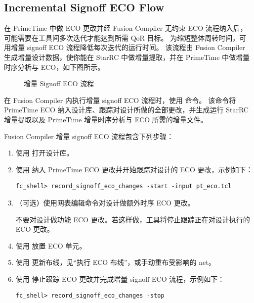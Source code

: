 \subsection*{Incremental Signoff ECO Flow}

在 PrimeTime 中做 ECO 更改并经 Fusion Compiler 无约束 ECO 流程纳入后，可能需要在工具间多次迭代才能达到所需 QoR 目标。
为缩短整体周转时间，可用增量 signoff ECO 流程降低每次迭代的运行时间。
该流程由 Fusion Compiler 生成增量设计数据，使你能在 StarRC 中做增量提取，并在 PrimeTime 中做增量时序分析与 ECO，如下图所示。

\begin{figure}[htbp]
\centering
{}
\caption{增量 Signoff ECO 流程}
\label{fig:fc-incr-signoff-eco}
\end{figure}

在 Fusion Compiler 内执行增量 signoff ECO 流程时，使用  命令。
该命令将 PrimeTime ECO 纳入设计库、跟踪对设计所做的全部更改，并生成运行 StarRC 增量提取以及 PrimeTime 增量时序分析与 ECO 所需的增量文件。

Fusion Compiler 增量 signoff ECO 流程包含下列步骤：
\begin{enumerate}
  \item 使用  打开设计库。
  \item 使用    纳入 PrimeTime ECO 更改并开始跟踪对设计的 ECO 更改，示例如下：
\begin{lstlisting}
fc_shell> record_signoff_eco_changes -start -input pt_eco.tcl
\end{lstlisting}
  \item （可选）使用网表编辑命令对设计做额外时序 ECO 更改。
  \begin{noteBox}
  不要对设计做功能 ECO 更改。若这样做，工具将停止跟踪正在对设计执行的 ECO 更改。
  \end{noteBox}
  \item 使用  放置 ECO 单元。
  \item 使用  更新布线，见``执行 ECO 布线''，或手动重布受影响的 net。
  \item 使用   停止跟踪 ECO 更改并完成增量 signoff ECO 流程，示例如下：
\begin{lstlisting}
fc_shell> record_signoff_eco_changes -stop
\end{lstlisting}
\end{enumerate}

